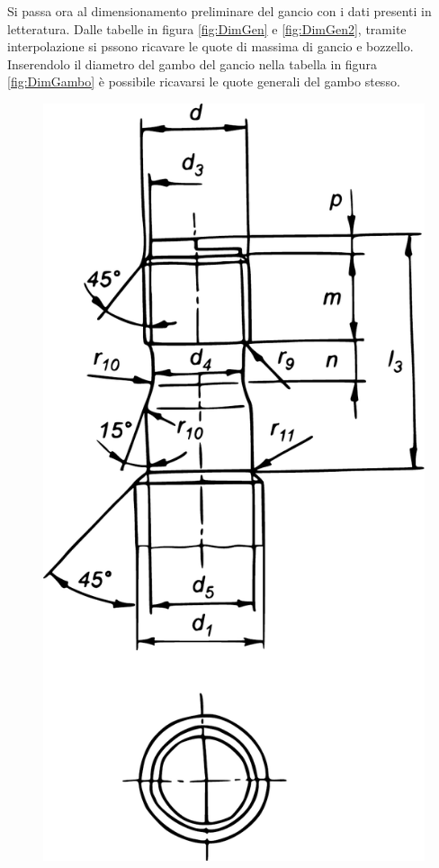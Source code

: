 Si passa ora al dimensionamento preliminare del gancio con i dati presenti in letteratura. 
Dalle tabelle in figura \ref{fig:DimGen} e \ref{fig:DimGen2}, tramite interpolazione si pssono ricavare le quote di massima di gancio e bozzello. Inserendolo il diametro del gambo del gancio nella tabella in figura \ref{fig:DimGambo} è possibile ricavarsi le quote generali del gambo stesso. 
\begin{figure}[H]
\centering
\begin{minipage}{.4\textwidth}
  \centering
  \includegraphics[width=.7\linewidth]{imgs/GamboDraw}
  \label{fig:GamboDraw}
\end{minipage}%
\begin{minipage}{.6\textwidth}
  \centering

\end{minipage}
\end{figure}
